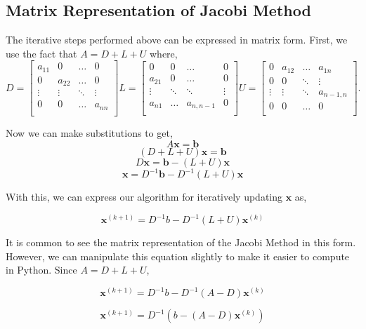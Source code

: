 \subsection*{Matrix Representation of Jacobi Method}
The iterative steps performed above can be expressed in matrix form. First, we use the fact that $A = D + L + U$ where,
$$
D = \begin{bmatrix}
a_{11} & 0 & \ldots & 0 \\
0 & a_{22} & \ldots & 0 \\
 \vdots & \vdots & \ddots & \vdots \\
0 & 0 & \ldots & a_{nn} \\
\end{bmatrix}
%
L = \begin{bmatrix}
0 & 0 & \ldots & 0 \\
a_{21} &  0 & \ldots & 0\\
 \vdots & \ddots & \ddots & \vdots \\
a_{n1} & \ldots & a_{n,n-1} & 0 \\
\end{bmatrix}
%
U = \begin{bmatrix}
0 & a_{12} & \ldots & a_{1n} \\
0 & 0 & \ddots & \vdots \\
 \vdots & \vdots & \ddots & a_{n-1,n} \\
0 & 0 & \ldots & 0 \\
\end{bmatrix}.
$$

Now we can make substitutions to get,
$$ A\mathbf{x} = \mathbf{b} $$
$$ (D + L + U)\mathbf{x} = \mathbf{b} $$
$$ D\mathbf{x} = \mathbf{b} - (L+U)\mathbf{x} $$
$$ \mathbf{x} = D^{-1}\mathbf{b} - D^{-1}(L+U)\mathbf{x} $$

With this, we can express our algorithm for iteratively updating $\mathbf{x}$ as,

\begin{equation}
\mathbf{x}^{(k+1)} = D^{-1}b - D^{-1}(L+U)\mathbf{x}^{(k)}
\end{equation}

It is common to see the matrix representation of the Jacobi Method in this form. However, we can manipulate this equation slightly to make it easier to compute in Python. Since $A = D + L + U$,

$$\mathbf{x}^{(k+1)} = D^{-1}b - D^{-1}(A-D)\mathbf{x}^{(k)} $$

\begin{equation} \label{eq:jacobi}
\mathbf{x}^{(k+1)} = D^{-1}(b - (A-D)\mathbf{x}^{(k)})
\end{equation}

